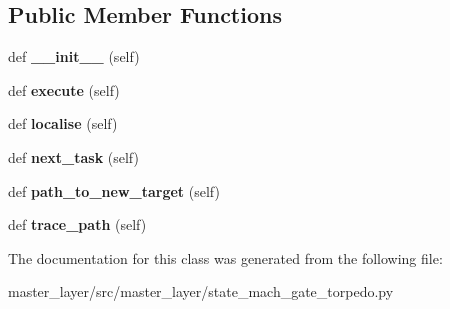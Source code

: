 \subsection*{Public Member Functions}
\begin{DoxyCompactItemize}
\item 
\mbox{\label{classmaster__layer_1_1state__mach__gate__torpedo_1_1RescueMode_a3ac1a2d2387aeb3892935c501abb40c1}} 
def {\bfseries \+\_\+\+\_\+init\+\_\+\+\_\+} (self)
\item 
\mbox{\label{classmaster__layer_1_1state__mach__gate__torpedo_1_1RescueMode_a2bf2f61f0b38d74c696aaf2a2f120308}} 
def {\bfseries execute} (self)
\item 
\mbox{\label{classmaster__layer_1_1state__mach__gate__torpedo_1_1RescueMode_ac39ccf375441db91601434b35cb7be70}} 
def {\bfseries localise} (self)
\item 
\mbox{\label{classmaster__layer_1_1state__mach__gate__torpedo_1_1RescueMode_abbb2754886ab35eba7e3b3ed303a9ce4}} 
def {\bfseries next\+\_\+task} (self)
\item 
\mbox{\label{classmaster__layer_1_1state__mach__gate__torpedo_1_1RescueMode_a3e2459d745ab47b16b9c39be5b58f158}} 
def {\bfseries path\+\_\+to\+\_\+new\+\_\+target} (self)
\item 
\mbox{\label{classmaster__layer_1_1state__mach__gate__torpedo_1_1RescueMode_a61034850ce1ec7449f9e144bb4191139}} 
def {\bfseries trace\+\_\+path} (self)
\end{DoxyCompactItemize}


The documentation for this class was generated from the following file\+:\begin{DoxyCompactItemize}
\item 
master\+\_\+layer/src/master\+\_\+layer/state\+\_\+mach\+\_\+gate\+\_\+torpedo.\+py\end{DoxyCompactItemize}

